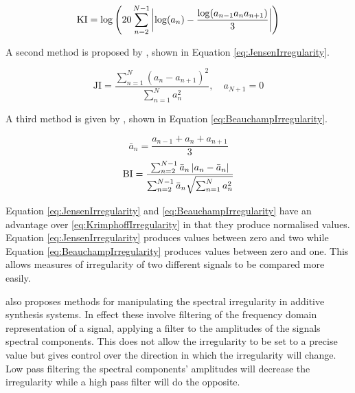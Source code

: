 		\begin{equation}
			\textrm{KI} = \log \left( 20 \sum_{n = 2}^{N - 1}
				                  \left|\log(a_{n}) - \frac{\log(a_{n-1}a_{n}a_{n+1})}
				                                             {3}\right|
					   \right)
			\label{eq:KrimphoffIrregularity}
		\end{equation}

		A second method is proposed by \citet{jensen1999timbre}, shown in Equation \ref{eq:JensenIrregularity}.

		\begin{equation}
			\textrm{JI} = \frac{\sum_{n = 1}^{N} (a_{n} - a_{n+1})^{2}}
			                   {\sum_{n = 1}^{N} a_{n}^{2}},
			              \quad a_{N+1} = 0
			\label{eq:JensenIrregularity}
		\end{equation}

		A third method is given by \citet{beauchamp2007analysis}, shown in Equation \ref{eq:BeauchampIrregularity}.

		\[ \bar{a}_{n} = \frac{a_{n-1} + a_{n} + a_{n+1}}{3} \]
		\begin{equation}
			\textrm{BI} = \frac{\sum_{n = 2}^{N - 1} \bar{a}_{n} \left|a_{n} - \bar{a}_{n}\right|}
					   {\sum_{n = 2}^{N - 1} \bar{a}_{n} \sqrt{\sum_{n = 1}^{N} a_{n}^{2}}}
			\label{eq:BeauchampIrregularity}
		\end{equation}

		Equation \ref{eq:JensenIrregularity} and \ref{eq:BeauchampIrregularity} have an advantage over
		\ref{eq:KrimphoffIrregularity} in that they produce normalised values. Equation \ref{eq:JensenIrregularity}
		produces values between zero and two while Equation \ref{eq:BeauchampIrregularity} produces values between
		zero and one. This allows measures of irregularity of two different signals to be compared more easily.

		\citet{beauchamp2007analysis} also proposes methods for manipulating the spectral irregularity in additive
		synthesis systems. In effect these involve filtering of the frequency domain representation of a signal,
		applying a filter to the amplitudes of the signals spectral components. This does not allow the
		irregularity to be set to a precise value but gives control over the direction in which the irregularity
		will change. Low pass filtering the spectral components' amplitudes will decrease the irregularity while a
		high pass filter will do the opposite.

